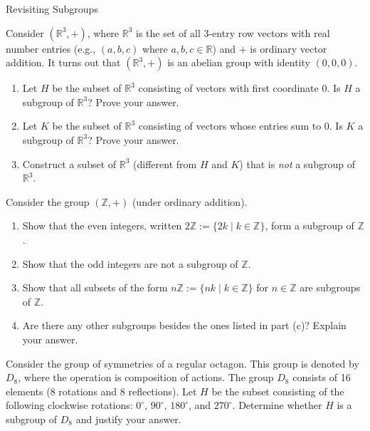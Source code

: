 \begin{section}{Revisiting Subgroups}
\begin{remark}
\end{remark}
\begin{exercise}
Consider $(\mathbb{R}^3,+)$, where $\mathbb{R}^3$ is the set of all 3-entry row vectors with real number entries (e.g., $(a,b,c)$ where $a,b,c\in\mathbb{R}$) and $+$ is ordinary vector addition.  It turns out that $(\mathbb{R}^3,+)$ is an abelian group with identity $(0,0,0)$.  
\begin{enumerate}[label=\rm{(\alph*)}]
\item Let $H$ be the subset of $\mathbb{R}^3$ consisting of vectors with first coordinate 0.  Is $H$ a subgroup of $\mathbb{R}^3$?  Prove your answer.
\item Let $K$ be the subset of $\mathbb{R}^3$ consisting of vectors whose entries sum to 0.  Is $K$ a subgroup of $\mathbb{R}^3$?  Prove your answer.
\item Construct a subset of $\mathbb{R}^3$ (different from $H$ and $K$) that is \emph{not} a subgroup of $\mathbb{R}^3$.
\end{enumerate}
\end{exercise}

\begin{exercise}\label{exer:nZ}
Consider the group $(\mathbb{Z},+)$ (under ordinary addition).
\begin{enumerate}[label=\rm{(\alph*)}]
\item Show that the even integers, written $2\mathbb{Z}:=\{2k\mid k\in\mathbb{Z}\}$, form a subgroup of $\mathbb{Z}$.
\item Show that the odd integers are not a subgroup of $\mathbb{Z}$.
\item Show that all subsets of the form $n\mathbb{Z}:=\{nk\mid k\in\mathbb{Z}\}$ for $n\in\mathbb{Z}$ are subgroups of $\mathbb{Z}$.
\item\label{exer:nZothers} Are there any other subgroups besides the ones listed in part (c)?  Explain your answer.
\end{enumerate}
\end{exercise}

\begin{exercise}
Consider the group of symmetries of a regular octagon.  This group is denoted by $D_8$, where the operation is composition of actions.  The group $D_8$ consists of 16 elements (8 rotations and 8 reflections).  Let $H$ be the subset consisting of the following clockwise rotations: $0^\circ$, $90^\circ$, $180^\circ$, and $270^\circ$.  Determine whether $H$ is a subgroup of $D_8$ and justify your answer.
\end{exercise}


\end{section}
